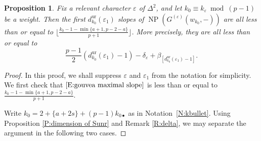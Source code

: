 \documentclass[12pt]{amsart}
\newtheorem{proposition}[subsection]{Proposition}
\theoremstyle{definition}
\numberwithin{equation}{subsection}
\DeclareMathOperator{\NP}{NP}
\newcommand{\unr}{\mathrm{ur}}
\begin{document}
\begin{proposition}
\label{P:gouvea k-1/p+1 conjecture}
Fix a relevant character $\varepsilon$ of $\Delta^2$, and let $k_0 \equiv k_\varepsilon \bmod{(p-1)}$ be a weight. Then the first $d_{k_0}^\unr(\varepsilon_1)$ slopes of $\NP(G^{(\varepsilon)}(w_{k_0}, -))$ are all less than or equal to $\big\lfloor\frac{k_0-1-\min\{a+1,p-2-a\}}{p+1}\big\rfloor$. More precisely, they are all less than or equal to
\begin{equation}
\label{E:gouvea maximal slope}
\frac{p-1}2(d_{k_0}^\unr(\varepsilon_1)-1)-\delta_\varepsilon + \beta_{[d_{k_0}^\unr(\varepsilon_1)-1]}.
\end{equation}
\end{proposition}
\begin{proof}
In this proof, we shall suppress $\varepsilon$ and $\varepsilon_1$ from the notation for simplicity.
We first check that $\eqref{E:gouvea maximal slope}$ is less than or equal to $\frac{k_0-1-\min\{a+1,p-2-a\}}{p+1}$.

Write $k_0 = 2+\{a+2s\} + (p-1)k_{0\bullet}$ as in Notation~\ref{N:kbullet}. Using Proposition \ref{P:dimension of Sunr} and Remark \ref{R:delta}, we may separate the argument in the following two cases.


\end{proof}
\end{document}
